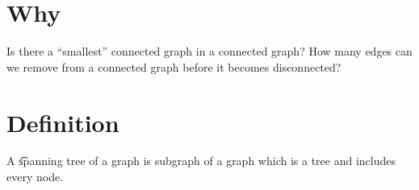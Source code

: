 

\section*{Why}

Is there a ``smallest'' connected graph in a connected graph?
How many edges can we remove from a connected graph before it becomes disconnected?

\section*{Definition}

A \t{spanning tree of a graph} is subgraph of a graph which is a tree and includes every node.
